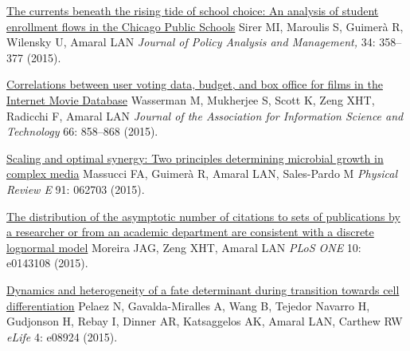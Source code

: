 \NumberedItem{\makebox[0.8cm][r]{[111]}}
\href{/people/amaral/currents-beneath-rising-tide-school-choice-analysis-student-enrollment-flows-chicago-public-schools}
{The currents beneath the rising tide of school choice: An analysis of student enrollment flows in the Chicago Public Schools}
\newline
Sirer MI, Maroulis S, Guimer\`a R, Wilensky U, Amaral LAN
\newline
\textit{Journal of Policy Analysis and Management,}
    34:
358--377 (2015).
\newline
\Gap
~
\Gap

\NumberedItem{\makebox[0.8cm][r]{[110]}}
\href{/people/amaral/correlations-between-user-voting-data-budget-and-box-office-films-internet-movie-database}
{Correlations between user voting data, budget, and box office for films in the Internet Movie Database}
\newline
Wasserman M, Mukherjee S, Scott K, Zeng XHT, Radicchi F, Amaral LAN
\newline
\textit{Journal of the Association for Information Science and Technology}
    66:
858--868 (2015).
\newline
\Gap
~
\Gap

\NumberedItem{\makebox[0.8cm][r]{[109]}}
\href{/people/amaral/scaling-and-optimal-synergy-two-principles-determining-microbial-growth-complex-media}
{Scaling and optimal synergy: Two principles determining microbial growth in complex media}
\newline
Massucci FA, Guimer\`a R, Amaral LAN, Sales-Pardo M
\newline
\textit{Physical Review E}
    91:
062703 (2015).
\newline
\Gap
~
\Gap

\NumberedItem{\makebox[0.8cm][r]{[108]}}
\href{/people/amaral/distribution-asymptotic-number-citations-sets-publications-researcher-or-academic-department-are-consistent-discrete-lognormal-model}
{The distribution of the asymptotic number of citations to sets of  publications by a researcher or from an academic department are consistent with a discrete lognormal model}
\newline
Moreira JAG, Zeng XHT, Amaral LAN
\newline
\textit{PLoS ONE}
    10:
e0143108 (2015).
\newline
\Gap
~
\Gap

\NumberedItem{\makebox[0.8cm][r]{[107]}}
\href{/people/amaral/dynamics-and-heterogeneity-fate-determinant-during-transition-towards-cell-differentiation}
{Dynamics and heterogeneity of a fate determinant during transition towards cell differentiation}
\newline
Pelaez N, Gavalda-Miralles A, Wang B, Tejedor Navarro H, Gudjonson H, Rebay I, Dinner AR, Katsaggelos AK, Amaral LAN, Carthew RW
\newline
\textit{eLife}
    4:
e08924 (2015).
\newline
\Gap
~
\Gap

